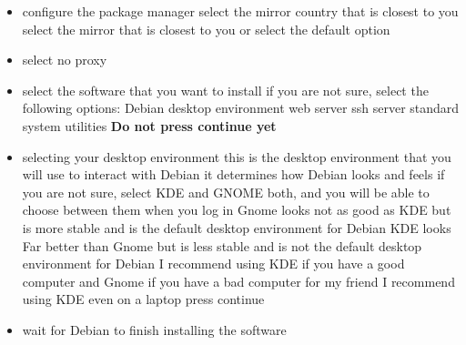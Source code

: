 \begin{itemize}
    \item configure the package manager
    \subitem select the mirror country that is closest to you 
    \subitem select the mirror that is closest to you or select the default option
    \item select no proxy
    \item select the software that you want to install
    \subitem if you are not sure, select the following options:
    \subsubitem Debian desktop environment
    \subsubitem web server
    \subsubitem ssh server
    \subsubitem standard system utilities
    \subsubitem \textbf{Do not press continue yet}
    \item selecting your desktop environment
    \subitem this is the desktop environment that you will use to interact with Debian it determines how Debian looks and feels if you are not sure, select KDE and GNOME both, and you will be able to choose between them when you log in
    \subitem Gnome looks not as good as KDE but is more stable and is the default desktop environment for Debian 
    \subitem KDE looks Far better than Gnome but is less stable and is not the default desktop environment for Debian I recommend using KDE if you have a good computer and Gnome if you have a bad computer for my friend I recommend using KDE even on a laptop 
    \subitem press continue
    \item wait for Debian to finish installing the software
\end{itemize}